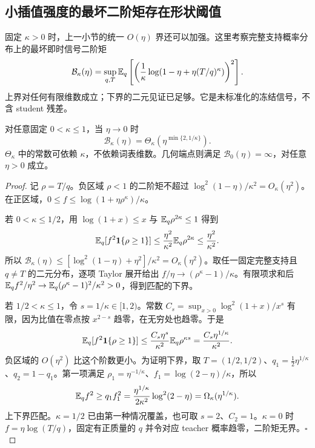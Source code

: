 \subsection{小插值强度的最坏二阶矩存在形状阈值}

固定 $\kappa>0$ 时，上一小节的统一 $O(\eta)$ 界还可以加强。这里考察完整支持概率分布上的最坏即时信号二阶矩
\begin{equation}
 \mathcal B_\kappa(\eta)
 =\sup_{q,T}\mathbb E_q\left[
 \left(\frac1\kappa\log(1-\eta+\eta(T/q)^\kappa)\right)^2
 \right].
\end{equation}
上界对任何有限维数成立；下界的二元见证已足够。它是未标准化的冻结信号，不含 student 残差。

\begin{theorem}[最坏二阶矩的精确小强度阶数]
\label{thm:proximal-moment-threshold}
对任意固定 $0<\kappa\le1$，当 $\eta\to0$ 时
\begin{equation}
 \mathcal B_\kappa(\eta)=\Theta_\kappa\left(\eta^{\min\{2,1/\kappa\}}\right).
 \label{eq:proximal-sharp-moment-order}
\end{equation}
$\Theta_\kappa$ 中的常数可依赖 $\kappa$，不依赖词表维数。几何端点则满足 $\mathcal B_0(\eta)=\infty$，对任意 $\eta>0$ 成立。
\end{theorem}

\begin{proof}
记 $\rho=T/q$。负区域 $\rho<1$ 的二阶矩不超过 $\log^2(1-\eta)/\kappa^2=O_\kappa(\eta^2)$。在正区域，$0\le f\le\log(1+\eta\rho^\kappa)/\kappa$。

若 $0<\kappa\le1/2$，用 $\log(1+x)\le x$ 与 $\mathbb E_q\rho^{2\kappa}\le1$ 得到
\begin{equation}
 \mathbb E_q[f^2\mathbf1\{\rho\ge1\}]
 \le\frac{\eta^2}{\kappa^2}\mathbb E_q\rho^{2\kappa}
 \le\frac{\eta^2}{\kappa^2}.
\end{equation}
所以 $\mathcal B_\kappa(\eta)\le[\log^2(1-\eta)+\eta^2]/\kappa^2=O_\kappa(\eta^2)$。取任一固定完整支持且 $q\ne T$ 的二元分布，逐项 Taylor 展开给出 $f/\eta\to(\rho^\kappa-1)/\kappa$。有限项求和后 $\mathbb E_qf^2/\eta^2\to\mathbb E_q(\rho^\kappa-1)^2/\kappa^2>0$，得到匹配的下界。

若 $1/2<\kappa\le1$，令 $s=1/\kappa\in[1,2)$。常数 $C_s=\sup_{x>0}\log^2(1+x)/x^s$ 有限，因为比值在零点按 $x^{2-s}$ 趋零，在无穷处也趋零。于是
\begin{equation}
 \mathbb E_q[f^2\mathbf1\{\rho\ge1\}]
 \le\frac{C_s\eta^s}{\kappa^2}\mathbb E_q\rho^{\kappa s}
 =\frac{C_s\eta^{1/\kappa}}{\kappa^2}.
\end{equation}
负区域的 $O(\eta^2)$ 比这个阶数更小。为证明下界，取 $T=(1/2,1/2)$、$q_1=\tfrac12\eta^{1/\kappa}$、$q_2=1-q_1$。第一项满足 $\rho_1=\eta^{-1/\kappa}$、$f_1=\log(2-\eta)/\kappa$，所以
\begin{equation}
 \mathbb E_qf^2\ge q_1f_1^2
 =\frac{\eta^{1/\kappa}}{2\kappa^2}\log^2(2-\eta)
 =\Omega_\kappa(\eta^{1/\kappa}).
\end{equation}
上下界匹配。$\kappa=1/2$ 已由第一种情况覆盖，也可取 $s=2$、$C_2=1$。$\kappa=0$ 时 $f=\eta\log(T/q)$，固定有正质量的 $q$ 并令对应 teacher 概率趋零，二阶矩无界。\hfill$\square$
\end{proof}

